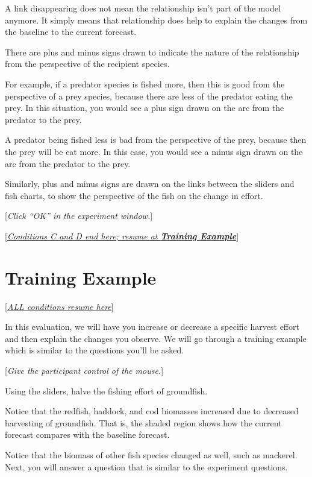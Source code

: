 {{{{\begin{minipage}{\textwidth}
{A link disappearing does not mean the relationship isn't part of the model anymore.  It simply means that relationship does help to explain the changes from the baseline to the current forecast.

There are plus and minus signs drawn to indicate the nature of the relationship from the perspective of the recipient species.

For example, if a predator species is fished more, then this is good from the perspective of a prey species, because there are less of the predator eating the prey.  In this situation, you would see a plus sign drawn on the arc from the predator to the prey.

A predator being fished less is bad from the perspective of the prey, because then the prey will be eat more.  In this case, you would see a minus sign drawn on the arc from the predator to the prey.

Similarly, plus and minus signs are drawn on the links between the sliders and fish charts, to show the perspective of the fish on the change in effort.


[\textit{Click ``OK'' in the experiment window.}]

[\underline{\textit{Conditions C and D end here; resume at \textbf{Training Example}}}]
}
\end{minipage}
}

\section{Training Example}

[\underline{\textit{ALL conditions resume here}}]

In this evaluation, we will have you increase or decrease a specific harvest effort and then explain the changes you observe.  We will go through a training example which is similar to the questions you'll be asked.

[\textit{Give the participant control of the mouse.}]

Using the sliders, halve the fishing effort of groundfish.

Notice that the redfish, haddock, and cod biomasses increased due to decreased harvesting of groundfish.  That is, the shaded region shows how the current forecast compares with the baseline forecast.

Notice that the biomass of other fish species changed as well, such as mackerel. Next, you will answer a question that is similar to the experiment questions.

}}}

